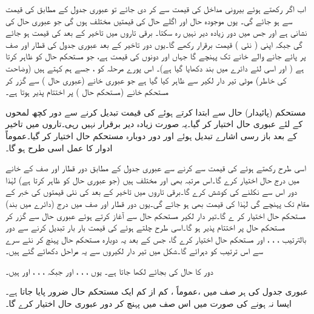 اب اگر  رکھتے ہوئے بیرونی مداخل  کی قیمت  سے  کر دی جائے تو عبوری جدول کے مطابق  کی قیمت  سے  ہو جائے گی۔ یوں موجودہ حال  اور اگلے حال  کی قیمتیں مختلف ہوں گی جو عبوری حال کی نشانی ہے اور جس میں دور زیادہ دیر نہیں رہ سکتا۔ برقی تاروں میں تاخیر کے بعد  کی قیمت  ہو جائے گی جبکہ  اپنی ( نئی ) قیمت  برقرار رکھے گا۔یوں دور تاخیر کے بعد عبوری جدول کی  قطار اور  صف پر پائے جانے والے خانے تک پہنچے گا جہاں  اور  دونوں کی قیمت  ہے، جو مستحکم حال کو ظاہر کرتا ہے ( اور اسی لئے دائرے میں بند دکھایا گیا ہے)۔ اس پورے مرحلہ کو   ، جسے ہم  کہتے ہیں (وضاحت کی خاطر)  موٹی   تیر دار لکیر سے ظاہر کیا گیا ہے جو عبوری خانے  (عبوری حال ) سے گزر کر مستحکم خانے (مستحکم حال   )  پر اختتام پذیر ہوتا ہے۔

 مستحکم (پائیدار) حال سے ابتدا کرتے ہوئے  کی قیمت تبدیل کرنے سے دور کچھ لمحوں کے لئے عبوری حال اختیار کر گیا۔یہ صورت زیادہ دیر برقرار نہیں رہی۔تاروں میں تاخیر کے بعد باز رسی اشارے تبدیل ہوئے اور دور دوبارہ مستحکم حال اختیار کر گیا۔عموماً ادوار کا عمل اسی طرح ہو گا۔

اسی طرح  رکھتے ہوئے  کی قیمت  سے  کرنے سے عبوری جدول کے مطابق دور  قطار اور  صف کے خانے میں درج حال  اختیار کرے گا۔اس مرتبہ بھی  اور  مختلف ہیں (جو عبوری حال کو ظاہر کرتا ہے) لہٰذا دور اس سے نکلنے کی کوشش کرے گا۔برقی تاروں میں تاخیر کے بعد  کی نئی قیمتوں کی خبر  کے مقام تک پہنچے گی لہٰذا  کی قیمت بھی  ہو جائے گی۔یوں دور  قطار اور  صف میں درج (دائرے میں بند) مستحکم حال  اختیار کر ے گا۔تیر دار لکیر مستحکم حال   سے  آغاز کرتے ہوئے عبوری حال  سے گزر کر مستحکم حال   پر اختتام پذیر ہو گا۔اسی طرح چلتے ہوئے  کی قیمت بار بار تبدیل کرنے سے دور بالترتیب  ، ، ، اور  مستحکم حال اختیار کرے گا، جس کے بعد یہ  دوبارہ مستحکم حال  پہنچ کر نئے سرے سے اس ترتیب کو دہرائے گا۔شکل میں تیر دار لکیروں سے یہ مراحل دکھائے گئے ہیں۔

 دور کا حال  کی بجائے  لکھا جاتا ہے۔ یوں ، ، ، اور  جبکہ ، ، ، اور  ہیں۔
 
عبوری جدول کی ہر صف میں ،عموماً ، کم از کم ایک مستحکم حال ضرور پایا جاتا ہے۔ایسا نہ ہونے کی صورت میں اس صف میں پہنچ کر دور عبوری حال اختیار کرے گا۔

